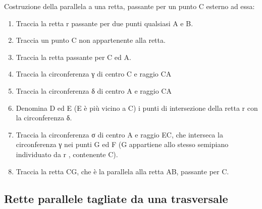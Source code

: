 \begin{procedura}
	Costruzione della parallela a una retta, passante per un punto C esterno ad essa:
	\begin{enumerate} [nosep]
		\item 
		Traccia la retta r  passante per due punti qualsiasi A e B.
		\item 
		Traccia un punto C non appartenente alla retta.
		\item 
		Traccia la retta passante per C ed A. 
		\item 
		Traccia la circonferenza γ di centro C e raggio CA  
		\item 			
		Traccia la circonferenza δ di centro A e raggio CA
		\item 	
		Denomina D ed E (E è più vicino a C) i punti di intersezione della retta r con la circonferenza δ.  
		\item 
		Traccia la circonferenza σ di centro A e raggio EC, che interseca la circonferenza γ nei punti G ed F (G appartiene allo stesso semipiano individuato da r , contenente C).
		\item
		Traccia la retta CG, che è la parallela alla retta AB, passante per C.
	\end{enumerate}
\end{procedura}

\subsection{Rette parallele tagliate da una trasversale}

